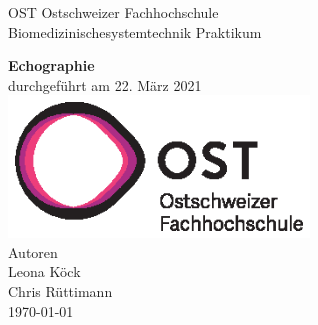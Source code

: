 \documentclass[11pt]{scrartcl}
\begin{document}
    \begin{titlepage}
        \begin{center}
        {\LARGE OST Ostschweizer Fachhochschule}
            \\[1.5cm]
            \linespread{1.2}\large { Biomedizinischesystemtechnik Praktikum }

            \huge{\bfseries Echographie}
            \\%
            \large{durchgeführt am 22. März 2021}
            \\[1.5cm]
           \includegraphics[width=8cm]{../images/ost_logo.eps}
           \\[1cm]
            {\small{Autoren}}\\
            {\Large{Leona Köck}}\\
            {\Large{Chris Rüttimann}}
            \\[1cm]

            \vspace*{\fill}
            \large{\today}
        \end{center}

    \end{titlepage}

    \addtocounter{section}{0}

    \tableofcontents
    \pagebreak



   
\end{document}
